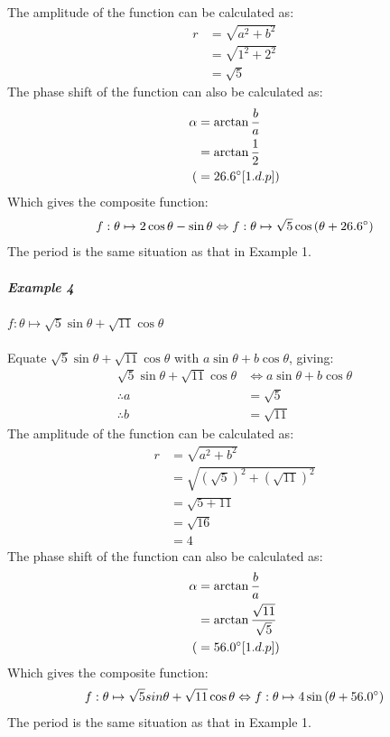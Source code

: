 \documentclass{article}
\begin{document}
        The amplitude of the function can be calculated as:
        \begin{align*}
        r &= \sqrt{a^2 + b^2} \\
        &= \sqrt{1^2 + 2^2} \\
        &= \sqrt{5}
        \end{align*}
        The phase shift of the function can also be calculated as:
        \begin{align*}
        \alpha &= \arctan{\frac{b}{a}} \\
        &= \arctan{\frac{1}{2}} \\
        (&= 26.6\degree [1.d.p]) 
        \end{align*}
        Which gives the composite function:
        \begin{align*}
        f:\theta \mapsto 2\cos{\theta} - \sin{\theta} \Leftrightarrow f:\theta \mapsto \sqrt{5}\cos{(\theta + 26.6\degree)}
        \end{align*}
        The period is the same situation as that in Example 1.
        \subparagraph{Example 4} $f:\theta \mapsto \sqrt{5}\sin{\theta} + \sqrt{11}\cos{\theta}$ \\\\
        Equate $\sqrt{5}\sin{\theta} + \sqrt{11}\cos{\theta}$ with $a\sin{\theta} + b\cos{\theta}$, giving:
        \begin{align*}
        \sqrt{5}\sin{\theta} + \sqrt{11}\cos{\theta} &\Leftrightarrow a\sin{\theta} + b\cos{\theta} \\
        \therefore a &= \sqrt{5} \\
        \therefore b &= \sqrt{11}
        \end{align*}
        The amplitude of the function can be calculated as:
        \begin{align*}
        r &= \sqrt{a^2 + b^2} \\
        &= \sqrt{(\sqrt{5})^2 + (\sqrt{11})^2} \\
        &= \sqrt{5 + 11} \\
        &= \sqrt{16} \\
        &= 4
        \end{align*}
        The phase shift of the function can also be calculated as:
        \begin{align*}
        \alpha &= \arctan{\frac{b}{a}} \\
        &= \arctan{\frac{\sqrt{11}}{\sqrt{5}}} \\
        (&= 56.0\degree [1.d.p]) 
        \end{align*}
        Which gives the composite function:
        \begin{align*}
        f:\theta \mapsto \sqrt{5}sin{\theta} + \sqrt{11}\cos{\theta} \Leftrightarrow f:\theta \mapsto 4\sin{(\theta + 56.0\degree)}
        \end{align*}
        The period is the same situation as that in Example 1.
        \newpage
\end{document}
